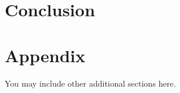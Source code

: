 \documentclass{article} %
\begin{document}
% 
\section{Conclusion}

%



%
\appendix
\section{Appendix}
You may include other additional sections here.
\end{document}
